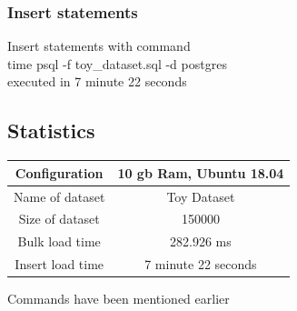 \documentclass[10pt]{article}
\begin{document}
\subsubsection{Insert statements}
Insert statements with command \\ 
time psql -f toy\_dataset.sql -d postgres \\ 
executed in 7 minute 22 seconds \\


\subsection{Statistics}
\begin{center}
 \begin{tabular}{||c c ||} 
 \hline
 Configuration & 10 gb Ram, Ubuntu 18.04 \\ 
 \hline
 Name of dataset & Toy Dataset \\ 
 \hline
 Size of dataset & 150000 \\
 \hline
 Bulk load time & 282.926 ms \\
 \hline
 Insert load time & 7 minute 22 seconds \\
 \hline
\end{tabular}
\end{center} 
Commands have been mentioned earlier

\end{document}
